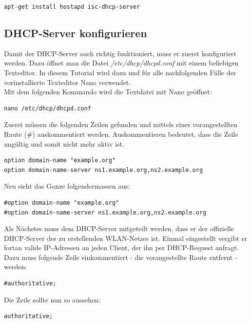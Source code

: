 \begin{lstlisting}
apt-get install hostapd isc-dhcp-server
\end{lstlisting}

\subsection{DHCP-Server konfigurieren}
Damit der DHCP-Server auch richtig funktioniert, muss er zuerst konfiguriert werden.
Dazu öffnet man die Datei \textit{/etc/dhcp/dhcpd.conf} mit einem beliebigen Texteditor. In diesem Tutorial wird dazu und für alle nachfolgenden Fälle der vorinstallierte Texteditor Nano verwendet.
\\
Mit dem folgenden Kommando wird die Textdatei mit Nano geöffnet:

\begin{lstlisting}
nano /etc/dhcp/dhcpd.conf
\end{lstlisting}

Zuerst müssen die folgenden Zeilen gefunden und mittels einer vorangestellten Raute (\#) auskommentiert werden. Auskommentieren bedeutet, dass die Zeile ungültig und somit nicht mehr aktiv ist.

\begin{lstlisting}
option domain-name "example.org"
option domain-name-server ns1.example.org,ns2.example.org
\end{lstlisting}

Neu sieht das Ganze folgendermassen aus:

\begin{lstlisting}
#option domain-name "example.org"
#option domain-name-server ns1.example.org,ns2.example.org
\end{lstlisting}

Als Nächstes muss dem DHCP-Server mitgeteilt werden, dass er der offizielle DHCP-Server des zu erstellenden WLAN-Netzes ist. Einmal eingestellt vergibt er fortan valide IP-Adressen an jeden Client, der ihn per DHCP-Request anfragt.
\\
Dazu muss folgende Zeile einkommentiert - die vorangestellte Raute entfernt - werden:

\begin{lstlisting}
#authoritative;
\end{lstlisting}

Die Zeile sollte nun so aussehen:

\begin{lstlisting}
authoritative;
\end{lstlisting}

